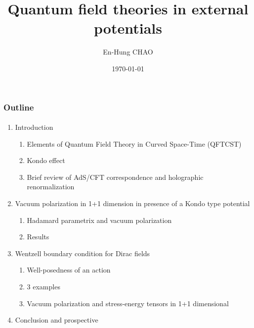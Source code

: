 \documentclass[french]{beamer}
\title{Quantum field theories in external potentials}
\author{En-Hung CHAO}
\institute{Ecole Polytechnique}
\date{\today}
\begin{document}

\begin{frame}
\titlepage%
\end{frame}
\begin{frame}
\frametitle{Outline}
\framesubtitle{}
\begin{enumerate}
 \item Introduction 
  \begin{enumerate}
  \item Elements of Quantum Field Theory in Curved Space-Time (QFTCST)
  \item Kondo effect
  \item Brief review of AdS/CFT correspondence and holographic renormalization
  \end{enumerate}
 \item Vacuum polarization in 1+1 dimension in presence of a Kondo type potential
  \begin{enumerate}
  \item Hadamard parametrix and vacuum polarization
  \item Results
  \end{enumerate}
 \item Wentzell boundary condition for Dirac fields
  \begin{enumerate}
  \item Well-posedness of an action
  \item 3 examples
  \item Vacuum polarization and stress-energy tensors in 1+1 dimensional
  \end{enumerate}
 \item Conclusion and prospective
\end{enumerate}
\end{frame}
\end{document}
